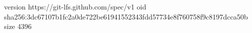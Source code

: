 version https://git-lfs.github.com/spec/v1
oid sha256:3dc67107b1fc2a0de722be61941552343fdd57734e8f760758f9c8197dcca50b
size 4396
